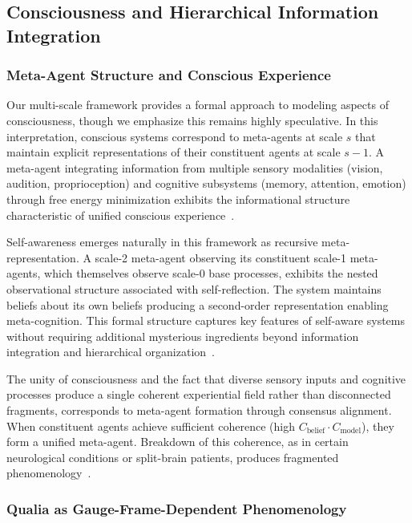 \documentclass[11pt]{article}
\begin{document}
\subsection{Consciousness and Hierarchical Information Integration}

\subsubsection{Meta-Agent Structure and Conscious Experience}

Our multi-scale framework provides a formal approach to modeling aspects of consciousness, though we emphasize this remains highly speculative. In this interpretation, conscious systems correspond to meta-agents at scale $s$ that maintain explicit representations of their constituent agents at scale $s-1$. A meta-agent integrating information from multiple sensory modalities (vision, audition, proprioception) and cognitive subsystems (memory, attention, emotion) through free energy minimization exhibits the informational structure characteristic of unified conscious experience~\cite{Tononi2004,Dehaene2014}.

Self-awareness emerges naturally in this framework as recursive meta-representation. A scale-2 meta-agent observing its constituent scale-1 meta-agents, which themselves observe scale-0 base processes, exhibits the nested observational structure associated with self-reflection. The system maintains beliefs about its own beliefs producing a second-order representation enabling meta-cognition. This formal structure captures key features of self-aware systems without requiring additional mysterious ingredients beyond information integration and hierarchical organization~\cite{Cleeremans2007}.

The unity of consciousness and the fact that diverse sensory inputs and cognitive processes produce a single coherent experiential field rather than disconnected fragments, corresponds to meta-agent formation through consensus alignment. When constituent agents achieve sufficient coherence (high $C_{\text{belief}} \cdot C_{\text{model}}$), they form a unified meta-agent. Breakdown of this coherence, as in certain neurological conditions or split-brain patients, produces fragmented phenomenology~\cite{Bayne2010}.

\subsubsection{Qualia as Gauge-Frame-Dependent Phenomenology}
\end{document}
